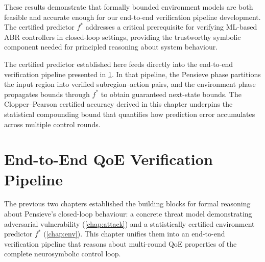 \documentclass[thesis]{uofithesis} %
\begin{document}
    These results demonstrate that formally bounded environment models are
    both feasible and accurate enough for our end-to-end verification pipeline development. 
    The certified predictor $f^{\ast}$ addresses a critical prerequisite for verifying
    ML-based ABR controllers in closed-loop settings, providing the
    trustworthy symbolic component needed for principled reasoning about
    system behaviour.

    The certified predictor established here feeds directly into the
    end-to-end verification pipeline presented in
    \ref{chap:verify}.  In that pipeline, the Pensieve phase
    partitions the input region into verified subregion--action pairs, and the environment
    phase propagates bounds through $f^{\ast}$ to obtain guaranteed
    next-state bounds.  The Clopper--Pearson certified accuracy derived in
    this chapter underpins the statistical compounding bound that quantifies
    how prediction error accumulates across multiple control rounds.


\section{End-to-End QoE Verification Pipeline}
\label{chap:verify}

    The previous two chapters established the building blocks for formal
    reasoning about Pensieve's closed-loop behaviour: a concrete threat
    model demonstrating adversarial vulnerability
    (\ref{chap:attack}) and a statistically certified environment
    predictor $f^{\ast}$ (\ref{chap:env}).  This chapter unifies
    them into an end-to-end verification pipeline that reasons about
    multi-round QoE properties of the complete neurosymbolic control loop.
\end{document}

